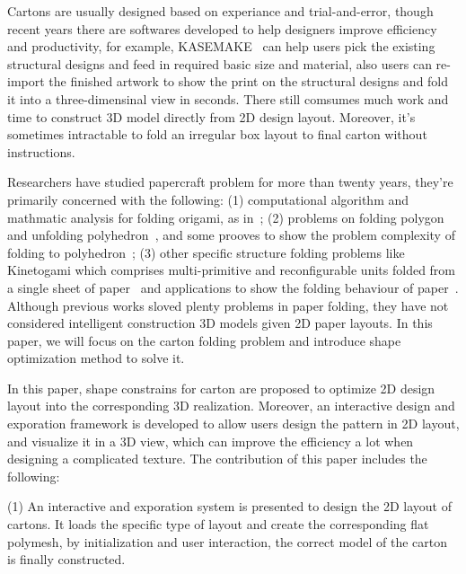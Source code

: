 \documentclass[submission]{gmp2018}
\begin{document}
Cartons are usually designed based on experiance and trial-and-error, though recent years there are softwares developed to help designers improve efficiency and productivity, for example, KASEMAKE~\cite{KASEMAKE} can help users pick the existing structural designs and feed in required basic size and material, also users can re-import the finished artwork to show the print on the structural designs and fold it into a three-dimensinal view in seconds. There still comsumes much work and time to construct 3D model directly from 2D design layout. Moreover, it's sometimes intractable to fold an irregular box layout to final carton without instructions.

Researchers have studied papercraft problem for more than twenty years, they're primarily concerned with the following: (1) computational algorithm and mathmatic analysis for folding origami, as in~\cite{Ida:2007:MOC:1802954.1803021,Lang:1996:CAO:237218.237249,xl-idetc-14}; (2) problems on folding polygon and unfolding polyhedron~\cite{Bern:2003:UPC:636968.636970,O'Rourke:1998:FUC:646319.686376,Rourke2008Unfolding}, and some prooves to show the problem complexity of folding to polyhedron~\cite{Biedl:2005:NFP:1090462.1646553,Biedl2004When,Lubiw1996When}; (3) other specific structure folding problems like Kinetogami which comprises multi-primitive and reconfigurable units folded from a single sheet of paper~\cite{Gao2013Kinetogami} and applications to show the folding behaviour of paper~\cite{Thiel1998,Kishi:1998:OFP:786112.786279,Nimnual2007Virtual,Shimanuki2009Construction}. Although previous works sloved plenty problems in paper folding, they have not considered intelligent construction 3D models given 2D paper layouts. In this paper, we will focus on the carton folding problem and introduce shape optimization method to solve it.

In this paper, shape constrains for carton are proposed to optimize 2D design layout into the corresponding 3D realization. Moreover, an interactive design and exporation framework is developed to allow users design the pattern in 2D layout, and visualize it in a 3D view, which can improve the efficiency a lot when designing a complicated texture. The contribution of this paper includes the following:

(1) An interactive and exporation system is presented to design the 2D layout of cartons. It loads the specific type of layout and create the corresponding flat polymesh, by initialization and user interaction, the correct model of the carton is finally constructed.
\end{document}
